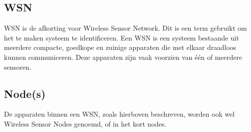 \documentclass{../local}
\begin{document}
\subsection{WSN}
WSN is de afkorting voor Wireless Sensor Network. Dit is een term gebruikt om het te maken systeem te identificeren. Een WSN is een systeem bestaande uit meerdere compacte, goedkope en zuinige apparaten die met elkaar draadloos kunnen communiceren. Deze apparaten zijn vaak voorzien van één of meerdere sensoren.

\subsection{Node(s)}
De apparaten binnen een WSN, zoals hierboven beschreven, worden ook wel Wireless Sensor Nodes genoemd, of in het kort nodes.
\end{document}
